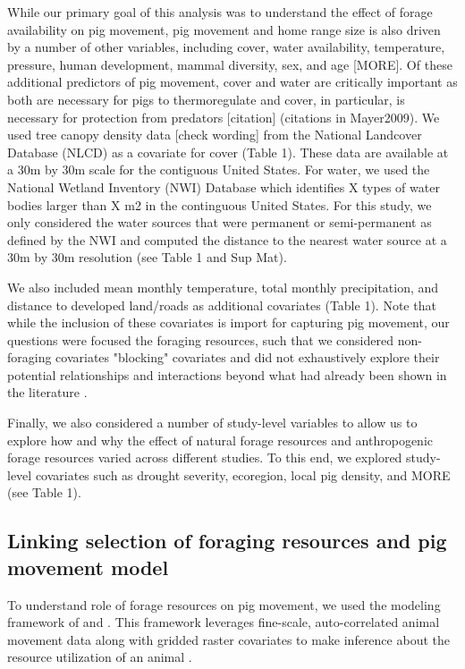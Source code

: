 \documentclass[a4paper]{article}
\begin{document}
While our primary goal of this analysis was to understand the effect of forage availability on pig movement, pig movement and home range size is also driven by a number of other variables, including cover, water availability, temperature, pressure, human development, mammal diversity, sex, and age \citep{McClure2015,Garza2017,Kay2017} [MORE].  Of these additional predictors of pig movement, cover and water are critically important as both are necessary for pigs to thermoregulate \citep{Choquenot1996a} and cover, in particular, is necessary for protection from predators [citation] (citations in Mayer2009). We used tree canopy density data [check wording] from the National Landcover Database (NLCD) as a covariate for cover (Table 1). These data are available at a 30m by 30m scale for the contiguous United States. For water, we used the National Wetland Inventory (NWI) Database which identifies X types of water bodies larger than X m2 in the continguous United States. For this study, we only considered the water sources that were permanent or semi-permanent as defined by the NWI and computed the distance to the nearest water source at a 30m by 30m resolution (see Table 1 and Sup Mat). 

We also included mean monthly temperature, total monthly precipitation, and distance to developed land/roads as additional covariates (Table 1). Note that while the inclusion of these covariates is import for capturing pig movement, our questions were focused the foraging resources, such that we considered non-foraging covariates "blocking" covariates and did not exhaustively explore their potential relationships and interactions beyond what had already been shown in the literature \citep[e.g.][]{Kay2017}.  

Finally, we also considered a number of study-level variables to allow us to explore how and why the effect of natural forage resources and anthropogenic forage resources varied across different studies. To this end, we explored study-level covariates such as drought severity, ecoregion, local pig density, and MORE (see Table 1). 

\subsection*{Linking selection of foraging resources and pig movement model}

To understand role of forage resources on pig movement, we used the modeling framework of \cite{Hanks2015} and \cite{Wilson2018}.  This framework leverages fine-scale, auto-correlated animal movement data along with gridded raster covariates to make inference about the resource utilization of an animal \citep{Hanks2015,Buderman2018,Wilson2018}.  
\end{document}
